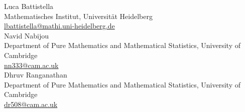 \documentclass[11pt]{amsart}
\theoremstyle{definition}
\theoremstyle{definition}
\begin{document}
\footnotesize




\bigskip\bigskip

\noindent Luca Battistella\\
Mathematisches Institut, Universit\"at Heidelberg \\
\href{mailto:lbattistella@mathi.uni-heidelberg.de}{lbattistella@mathi.uni-heidelberg.de}\\

\noindent Navid Nabijou \\
Department of Pure Mathematics and Mathematical Statistics, University of Cambridge \\
\href{mailto:nn333@cam.ac.uk}{nn333@cam.ac.uk}\\

\noindent Dhruv Ranganathan \\
Department of Pure Mathematics and Mathematical Statistics, University of Cambridge \\
\href{mailto:dr508@cam.ac.uk}{dr508@cam.ac.uk}
\end{document}
